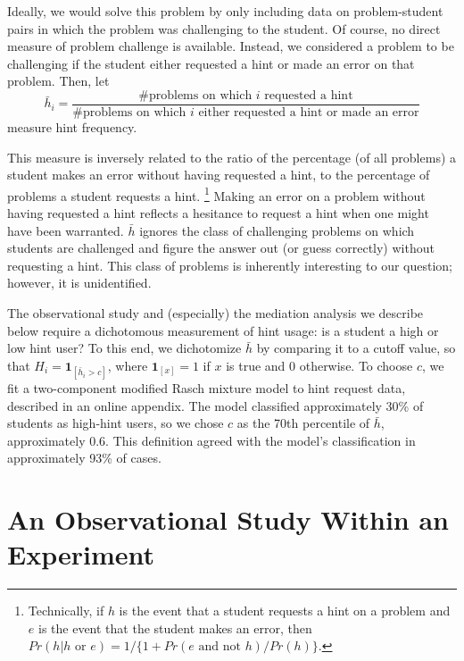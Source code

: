 \documentclass{article}\usepackage[]{graphicx}\usepackage[]{color}
\newcommand{\indicator}[1]{\mathbf{1}_{\left[ {#1} \right] }}
\begin{document}
Ideally, we would solve this problem by only including data on
problem-student pairs in which the problem was challenging to the
student.
Of course, no direct measure of problem challenge is available.
Instead, we considered a problem to be challenging if the student
either requested a hint or made an error on that problem.
Then, let
\begin{equation*}
\bar{h}_i=\frac{\text{\# problems on which }i\text{ requested a
    hint}}{\text{\# problems on which }i\text{ either requested a hint
    or made an error}}
\end{equation*}
measure hint frequency.

This measure is inversely related to the ratio of the percentage (of all
problems) a student makes an error without having requested a hint,
to the percentage of problems a student requests a hint.%
\footnote{Technically, if $h$ is the event that a student requests
a hint on a problem and $e$ is the event that the student makes
an error, then $Pr(h|h\text{ or }e)=1/\{1+Pr(e\text{ and not }h)/Pr(h)\}$.}
Making an error on a problem without having requested a hint reflects
a hesitance to request a hint when one might have been warranted.
$\bar{h}$ ignores the class of challenging problems on which students
are challenged and figure the answer out (or guess correctly) without
requesting a hint.
This class of problems is inherently interesting to our question;
however, it is unidentified.

The observational study and (especially) the mediation analysis we
describe below require a dichotomous measurement of hint usage: is a
student a high or low hint user?
To this end, we dichotomize $\bar{h}$ by comparing it to a cutoff value, so
that $H_i=\indicator{\bar{h}_i>c}$, where $\indicator{x}=1$ if $x$ is true
and 0 otherwise.
To choose $c$, we fit a two-component modified Rasch mixture model
\citep{rasch} to hint request data, described in an online appendix.
The model classified approximately 30\% of students as
high-hint users, so we chose $c$ as the
70th percentile of $\bar{h}$,
approximately 0.6.
This definition agreed with the model's classification in
approximately 93\% of cases.






\section{An Observational Study Within an Experiment}\label{sec:observational}
\end{document}
